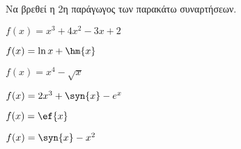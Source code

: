 Να βρεθεί η 2η παράγωγος των παρακάτω συναρτήσεων.
\begin{multicols}{2}
\begin{alist}
\item $ f(x)=x^3+4x^2-3x+2 $
\item $ f(x)=\ln{x}+\hm{x} $
\item $ f(x)=x^4-\sqrt{x} $
\item $ f(x)=2x^3+\syn{x}-e^x $
\item $ f(x)=\ef{x} $
\item $ f(x)=\syn{x}-x^2 $
\end{alist}
\end{multicols}
